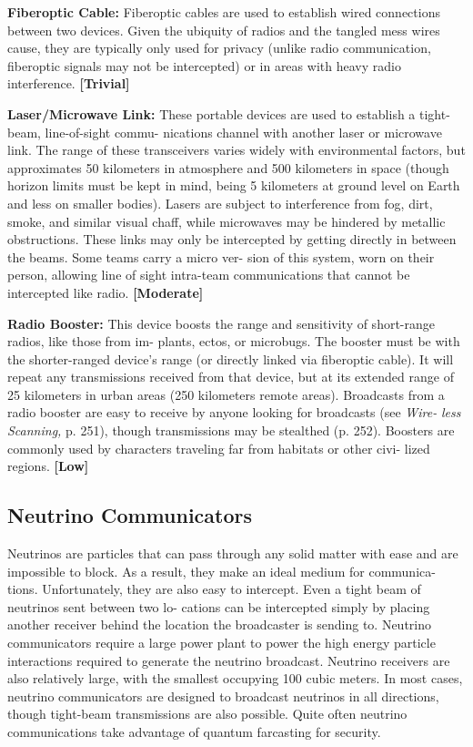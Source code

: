 \textbf{Fiberoptic Cable:} Fiberoptic cables are used to 
establish wired connections between two devices. 
Given the ubiquity of radios and the tangled mess 
wires cause, they are typically only used for privacy 
(unlike radio communication, fiberoptic signals may 
not be intercepted) or in areas with heavy radio 
interference. \textbf{[Trivial]}

\textbf{Laser/Microwave Link:} These portable devices are 
used to establish a tight-beam, line-of-sight commu-
nications channel with another laser or microwave 
link. The range of these transceivers varies widely 
with environmental factors, but approximates 50 
kilometers in atmosphere and 500 kilometers in 
space (though horizon limits must be kept in mind, 
being 5 kilometers at ground level on Earth and less 
on smaller bodies). Lasers are subject to interference 
from fog, dirt, smoke, and similar visual chaff, while 
microwaves may be hindered by metallic obstructions. 
These links may only be intercepted by getting directly 
in between the beams. Some teams carry a micro ver-
sion of this system, worn on their person, allowing 
line of sight intra-team communications that cannot 
be intercepted like radio. \textbf{[Moderate]}

\textbf{Radio Booster:} This device boosts the range and 
sensitivity of short-range radios, like those from im-
plants, ectos, or microbugs. The booster must be with 
the shorter-ranged device's range (or directly linked 
via fiberoptic cable). It will repeat any transmissions 
received from that device, but at its extended range of 
25 kilometers in urban areas (250 kilometers remote 
areas). Broadcasts from a radio booster are easy to 
receive by anyone looking for broadcasts (see \textit{Wire-}
\textit{less Scanning,} p. 251), though transmissions may be 
stealthed (p. 252). Boosters are commonly used by 
characters traveling far from habitats or other civi-
lized regions. \textbf{[Low]}

\subsection{Neutrino Communicators}

Neutrinos are particles that can pass through any 
solid matter with ease and are impossible to block. As 
a result, they make an ideal medium for communica-
tions. Unfortunately, they are also easy to intercept. 
Even a tight beam of neutrinos sent between two lo-
cations can be intercepted simply by placing another 
receiver behind the location the broadcaster is sending 
to. Neutrino communicators require a large power 
plant to power the high energy particle interactions 
required to generate the neutrino broadcast. Neutrino 
receivers are also relatively large, with the smallest 
occupying 100 cubic meters. In most cases, neutrino 
communicators are designed to broadcast neutrinos 
in all directions, though tight-beam transmissions are 
also possible. Quite often neutrino communications 
take advantage of quantum farcasting for security.

